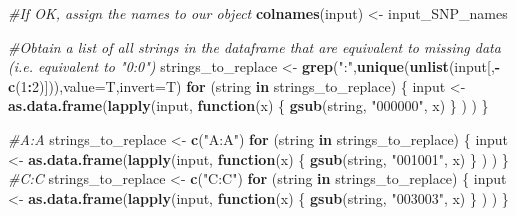 \documentclass[
]{article}
\newenvironment{Shaded}{\begin{snugshade}}{\end{snugshade}}
\newcommand{\CommentTok}[1]{\textcolor[rgb]{0.56,0.35,0.01}{\textit{#1}}}
\newcommand{\ControlFlowTok}[1]{\textcolor[rgb]{0.13,0.29,0.53}{\textbf{#1}}}
\newcommand{\DataTypeTok}[1]{\textcolor[rgb]{0.13,0.29,0.53}{#1}}
\newcommand{\DecValTok}[1]{\textcolor[rgb]{0.00,0.00,0.81}{#1}}
\newcommand{\KeywordTok}[1]{\textcolor[rgb]{0.13,0.29,0.53}{\textbf{#1}}}
\newcommand{\NormalTok}[1]{#1}
\newcommand{\OperatorTok}[1]{\textcolor[rgb]{0.81,0.36,0.00}{\textbf{#1}}}
\newcommand{\StringTok}[1]{\textcolor[rgb]{0.31,0.60,0.02}{#1}}
\begin{document}
\begin{Shaded}
\begin{Highlighting}[]
\CommentTok{#If OK, assign the names to our object}
\KeywordTok{colnames}\NormalTok{(input) <-}\StringTok{ }\NormalTok{input_SNP_names}

\CommentTok{#Obtain a list of all strings in the dataframe that are equivalent to missing data (i.e. equivalent to "0:0")}
\NormalTok{strings_to_replace <-}\StringTok{ }\KeywordTok{grep}\NormalTok{(}\StringTok{":"}\NormalTok{,}\KeywordTok{unique}\NormalTok{(}\KeywordTok{unlist}\NormalTok{(input[,}\OperatorTok{-}\KeywordTok{c}\NormalTok{(}\DecValTok{1}\OperatorTok{:}\DecValTok{2}\NormalTok{)])),}\DataTypeTok{value=}\NormalTok{T,}\DataTypeTok{invert=}\NormalTok{T)}
\ControlFlowTok{for}\NormalTok{ (string }\ControlFlowTok{in}\NormalTok{ strings_to_replace) \{ }
\NormalTok{  input <-}\StringTok{ }\KeywordTok{as.data.frame}\NormalTok{(}\KeywordTok{lapply}\NormalTok{(input, }\ControlFlowTok{function}\NormalTok{(x) \{ }
                                \KeywordTok{gsub}\NormalTok{(string, }\StringTok{"000000"}\NormalTok{, x)}
\NormalTok{                                \}}
\NormalTok{                              )}
\NormalTok{                        )}
\NormalTok{  \}}
  
\CommentTok{#A:A}
\NormalTok{strings_to_replace <-}\StringTok{ }\KeywordTok{c}\NormalTok{(}\StringTok{"A:A"}\NormalTok{)}
\ControlFlowTok{for}\NormalTok{ (string }\ControlFlowTok{in}\NormalTok{ strings_to_replace) \{ }
\NormalTok{  input <-}\StringTok{ }\KeywordTok{as.data.frame}\NormalTok{(}\KeywordTok{lapply}\NormalTok{(input, }\ControlFlowTok{function}\NormalTok{(x) \{ }
                                \KeywordTok{gsub}\NormalTok{(string, }\StringTok{"001001"}\NormalTok{, x)}
\NormalTok{                                \}}
\NormalTok{                              )}
\NormalTok{                        )}
\NormalTok{  \}}
\CommentTok{#C:C}
\NormalTok{strings_to_replace <-}\StringTok{ }\KeywordTok{c}\NormalTok{(}\StringTok{"C:C"}\NormalTok{)}
\ControlFlowTok{for}\NormalTok{ (string }\ControlFlowTok{in}\NormalTok{ strings_to_replace) \{ }
\NormalTok{  input <-}\StringTok{ }\KeywordTok{as.data.frame}\NormalTok{(}\KeywordTok{lapply}\NormalTok{(input, }\ControlFlowTok{function}\NormalTok{(x) \{ }
                                \KeywordTok{gsub}\NormalTok{(string, }\StringTok{"003003"}\NormalTok{, x)}
\NormalTok{                                \}}
\NormalTok{                              )}
\NormalTok{                        )}
\NormalTok{  \}}


\end{Highlighting}
\end{Shaded}
\end{document}
